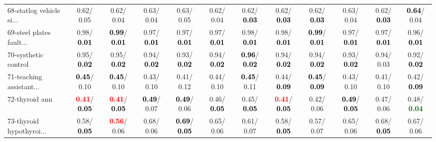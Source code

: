 \begin{table}[h]
\begin{center}
{\begin{tabular}{lc|c|c|c|c|c|c|c|c|c|c}
68-statlog vehicle si... &   0.62/  0.05 &   0.62/  0.04 &   0.63/  0.04 &   0.63/  0.05 &   0.62/  0.04 &   0.62/\textcolor{black}{\textbf{  0.03}} &   0.62/\textcolor{black}{\textbf{  0.03}} &   0.62/\textcolor{black}{\textbf{  0.03}} &   0.63/  0.04 &   0.62/\textcolor{black}{\textbf{  0.03}} & \textcolor{black}{\textbf{  0.64}}/  0.04 \\
69-steel plates fault... &   0.98/\textcolor{black}{\textbf{  0.01}} & \textcolor{black}{\textbf{  0.99}}/\textcolor{black}{\textbf{  0.01}} &   0.97/\textcolor{black}{\textbf{  0.01}} &   0.97/\textcolor{black}{\textbf{  0.01}} &   0.97/\textcolor{black}{\textbf{  0.01}} &   0.98/\textcolor{black}{\textbf{  0.01}} &   0.98/\textcolor{black}{\textbf{  0.01}} & \textcolor{black}{\textbf{  0.99}}/\textcolor{black}{\textbf{  0.01}} &   0.97/\textcolor{black}{\textbf{  0.01}} &   0.97/\textcolor{black}{\textbf{  0.01}} &   0.96/\textcolor{black}{\textbf{  0.01}} \\
70-systhetic control &   0.95/\textcolor{black}{\textbf{  0.02}} &   0.95/\textcolor{black}{\textbf{  0.02}} &   0.94/\textcolor{black}{\textbf{  0.02}} &   0.93/\textcolor{black}{\textbf{  0.02}} &   0.94/\textcolor{black}{\textbf{  0.02}} & \textcolor{black}{\textbf{  0.96}}/\textcolor{black}{\textbf{  0.02}} &   0.94/\textcolor{black}{\textbf{  0.02}} &   0.94/\textcolor{black}{\textbf{  0.02}} &   0.93/\textcolor{black}{\textbf{  0.02}} &   0.94/  0.03 &   0.92/\textcolor{black}{\textbf{  0.02}} \\
71-teaching assistant... & \textcolor{black}{\textbf{  0.45}}/  0.10 & \textcolor{black}{\textbf{  0.45}}/  0.10 &   0.43/  0.10 &   0.41/  0.12 &   0.44/  0.10 & \textcolor{black}{\textbf{  0.45}}/  0.11 &   0.44/\textcolor{black}{\textbf{  0.09}} & \textcolor{black}{\textbf{  0.45}}/\textcolor{black}{\textbf{  0.09}} &   0.43/  0.10 &   0.41/  0.10 &   0.42/\textcolor{black}{\textbf{  0.09}} \\ \hline
72-thyroid ann & \textcolor{red}{\textbf{  0.41}}/\textcolor{black}{\textbf{  0.05}} & \textcolor{red}{\textbf{  0.41}}/\textcolor{black}{\textbf{  0.05}} & \textcolor{black}{\textbf{  0.49}}/  0.07 & \textcolor{black}{\textbf{  0.49}}/  0.06 &   0.46/\textcolor{black}{\textbf{  0.05}} &   0.45/\textcolor{black}{\textbf{  0.05}} & \textcolor{red}{\textbf{  0.41}}/\textcolor{black}{\textbf{  0.05}} &   0.42/  0.06 & \textcolor{black}{\textbf{  0.49}}/\textcolor{black}{\textbf{  0.05}} &   0.47/  0.06 &   0.48/\textcolor{darkgreen}{\textbf{  0.04}} \\
73-thyroid hypothyroi... &   0.58/\textcolor{black}{\textbf{  0.05}} & \textcolor{red}{\textbf{  0.56}}/  0.06 &   0.68/  0.06 & \textcolor{black}{\textbf{  0.69}}/\textcolor{black}{\textbf{  0.05}} &   0.65/  0.06 &   0.61/  0.07 &   0.58/\textcolor{black}{\textbf{  0.05}} &   0.57/  0.07 &   0.65/  0.06 &   0.68/\textcolor{black}{\textbf{  0.05}} &   0.67/  0.06 \\

\end{tabular}}
\end{center}
\end{table}

